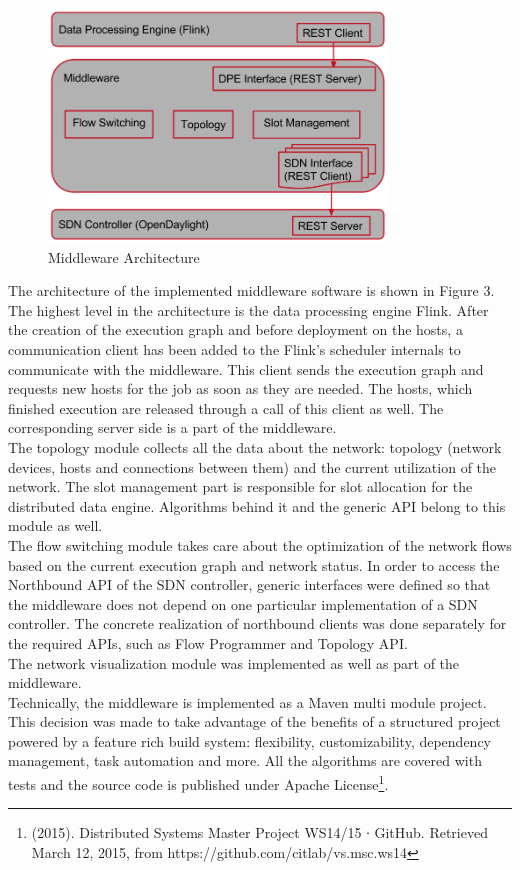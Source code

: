 \begin{figure}[h]
    \centering
    \includegraphics[width=0.8\textwidth]{graphics/architecture.png}
    \caption{Middleware Architecture}
    \label{fig:architecture}
\end{figure}

The architecture of the implemented middleware software is shown in Figure 3.\\
The highest level in the architecture is the data processing engine Flink. After the creation of the
execution graph and before deployment on the hosts, a communication client has been added to the Flink's
scheduler internals to communicate with the middleware. This client sends the execution graph and
requests new hosts for the job as soon as they are needed. The hosts, which finished execution are
released through a call of this client as well. The corresponding server side is a part of the
middleware. \\
The topology module collects all the data about the network: topology (network devices, hosts and
connections between them) and the current utilization of the network. The slot management part is
responsible for slot allocation for the distributed data engine. Algorithms behind it and the generic
API belong to this module as well. \\
The flow switching module takes care about the optimization of the network flows based on the
current execution graph and network status. In order to access the Northbound API of the SDN
controller, generic interfaces were defined so that the middleware does not depend on one particular
implementation of a SDN controller. The concrete realization of northbound clients was done
separately for the required APIs, such as Flow Programmer and Topology API.\\
The network visualization module was implemented as well as part of the middleware.\\
Technically, the middleware is implemented as a Maven multi module project. This decision was made to
take advantage of the benefits of a structured project powered by a feature rich build system: flexibility,
customizability, dependency management, task automation and more. All the algorithms are covered
with tests and the source code is published under Apache License\footnote{(2015). Distributed
Systems Master Project WS14/15 ∙ GitHub. Retrieved March 12, 2015, from https://github.com/citlab/vs.msc.ws14}.

